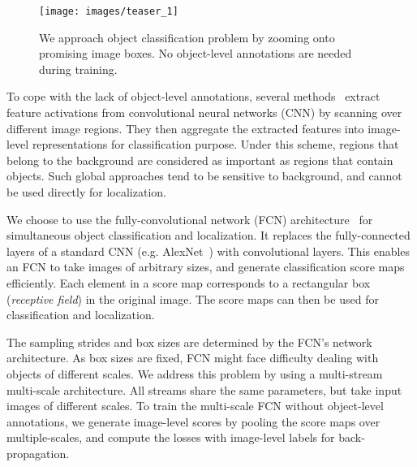 \documentclass[10pt,twocolumn,letterpaper]{article}
\begin{document}
\begin{figure}[t]
  \centering
    \texttt{[image: images/teaser\_1]}
  \caption{We approach object classification problem by zooming onto promising image boxes. No object-level annotations are needed during training.}
  \label{fig:teaser}
\end{figure}

To cope with the lack of object-level annotations, several methods~\cite{DBLP:journals/corr/ChatfieldSVZ14,DBLP:journals/corr/GongWGL14,Simonyan14c} extract feature activations from convolutional neural networks (CNN) by scanning over different image regions. They then aggregate the extracted features into image-level representations for classification purpose. Under this scheme, regions that belong to the background are considered as important as regions that contain objects. Such global approaches tend to be sensitive to background, and cannot be used directly for localization.

We choose to use the fully-convolutional network (FCN) architecture~\cite{DBLP:journals/corr/LongSD14,Oquab_2015_CVPR,pinheiro:2015a,DBLP:journals/corr/SermanetEZMFL13,DBLP:journals/corr/PathakSLD14} for simultaneous object classification and localization. It replaces the fully-connected layers of a standard CNN (e.g. AlexNet~\cite{NIPS2012_4824}) with convolutional layers. This enables an FCN to take images of arbitrary sizes, and generate classification score maps efficiently. Each element in a score map corresponds to a rectangular box (\textit{receptive field}) in the original image. The score maps can then be used for classification and localization.

The sampling strides and box sizes are determined by the FCN's network architecture. As box sizes are fixed, FCN might face difficulty dealing with objects of different scales. We address this problem by using a multi-stream multi-scale architecture. All streams share the same parameters, but take input images of different scales. To train the multi-scale FCN without object-level annotations, we generate image-level scores by pooling the score maps over multiple-scales, and compute the losses with image-level labels for back-propagation.

\end{document}
